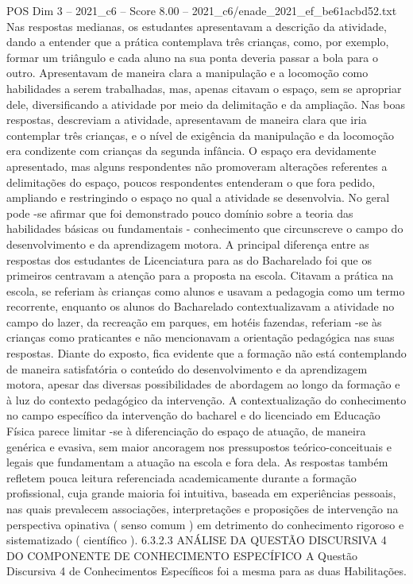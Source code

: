 \begin{textsample}{POS Dim 3 – 2021\_c6 – Score 8.00 – 2021\_c6/enade\_2021\_ef\_be61acbd52.txt}
Nas respostas medianas, os estudantes apresentavam a descrição da atividade, dando a entender que a prática contemplava três crianças, como, por exemplo, formar um triângulo e cada aluno na sua ponta deveria passar a bola para o outro.
Apresentavam de maneira clara a manipulação e a locomoção como habilidades a serem trabalhadas, mas, apenas citavam o espaço, sem se apropriar dele, diversificando a atividade por meio da delimitação e da ampliação.
Nas boas respostas, descreviam a atividade, apresentavam de maneira clara que iria contemplar três crianças, e o nível de exigência da manipulação e da locomoção era condizente com crianças da segunda infância.
O espaço era devidamente apresentado, mas alguns respondentes não promoveram alterações referentes a delimitações do espaço, poucos respondentes entenderam o que fora pedido, ampliando e restringindo o espaço no qual a atividade se desenvolvia.
No geral pode -se afirmar que foi demonstrado pouco domínio sobre a teoria das habilidades básicas ou fundamentais - conhecimento que circunscreve o campo do desenvolvimento e da aprendizagem motora.
A principal diferença entre as respostas dos estudantes de Licenciatura para as do Bacharelado foi que os primeiros centravam a atenção para a proposta na escola.
Citavam a prática na escola, se referiam às crianças como alunos e usavam a pedagogia como um termo recorrente, enquanto os alunos do Bacharelado contextualizavam a atividade no campo do lazer, da recreação em parques, em hotéis fazendas, referiam -se às crianças como praticantes e não mencionavam a orientação pedagógica nas suas respostas.
Diante do exposto, fica evidente que a formação não está contemplando de maneira satisfatória o conteúdo do desenvolvimento e da aprendizagem motora, apesar das diversas possibilidades de abordagem ao longo da formação e à luz do contexto pedagógico da intervenção.
A contextualização do conhecimento no campo específico da intervenção do bacharel e do licenciado em Educação Física parece limitar -se à diferenciação do espaço de atuação, de maneira genérica e evasiva, sem maior ancoragem nos pressupostos teórico-conceituais e legais que fundamentam a atuação na escola e fora dela.
As respostas também refletem pouca leitura referenciada academicamente durante a formação profissional, cuja grande maioria foi intuitiva, baseada em experiências pessoais, nas quais prevalecem associações, interpretações e proposições de intervenção na perspectiva opinativa ( senso comum ) em detrimento do conhecimento rigoroso e sistematizado ( científico ). 6.3.2.3 ANÁLISE DA QUESTÃO DISCURSIVA 4 DO COMPONENTE DE CONHECIMENTO ESPECÍFICO A Questão Discursiva 4 de Conhecimentos Específicos foi a mesma para as duas Habilitações.

\end{textsample}
